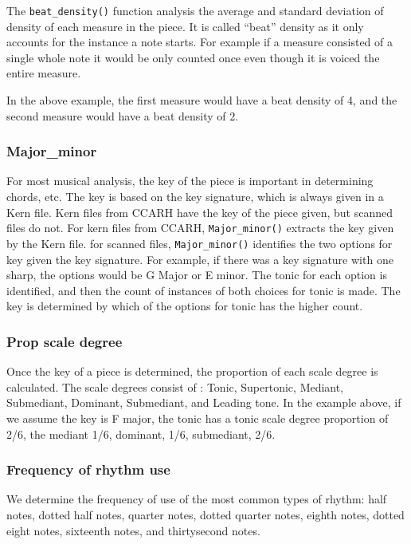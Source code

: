 \documentclass[12pt,twoside]{reedthesis}
\theoremstyle{definition}
\theoremstyle{definition}
\theoremstyle{definition}
\theoremstyle{remark}
\begin{document}
The \texttt{beat\_density()} function analysis the average and standard
deviation of density of each measure in the piece. It is called ``beat''
density as it only accounts for the instance a note starts. For example
if a measure consisted of a single whole note it would be only counted
once even though it is voiced the entire measure.

In the above example, the first measure would have a beat density of 4,
and the second measure would have a beat density of 2.

\subsubsection{Major\_minor}\label{major_minor}

For most musical analysis, the key of the piece is important in
determining chords, etc. The key is based on the key signature, which is
always given in a Kern file. Kern files from CCARH have the key of the
piece given, but scanned files do not. For kern files from CCARH,
\texttt{Major\_minor()} extracts the key given by the Kern file. for
scanned files, \texttt{Major\_minor()} identifies the two options for
key given the key signature. For example, if there was a key signature
with one sharp, the options would be G Major or E minor. The tonic for
each option is identified, and then the count of instances of both
choices for tonic is made. The key is determined by which of the options
for tonic has the higher count.

\subsubsection{Prop scale degree}\label{prop-scale-degree}

Once the key of a piece is determined, the proportion of each scale
degree is calculated. The scale degrees consist of : Tonic, Supertonic,
Mediant, Submediant, Dominant, Submediant, and Leading tone. In the
example above, if we assume the key is F major, the tonic has a tonic
scale degree proportion of 2/6, the mediant 1/6, dominant, 1/6,
submediant, 2/6.

\subsubsection{Frequency of rhythm use}\label{frequency-of-rhythm-use}

We determine the frequency of use of the most common types of rhythm:
half notes, dotted half notes, quarter notes, dotted quarter notes,
eighth notes, dotted eight notes, sixteenth notes, and thirtysecond
notes.
\end{document}
